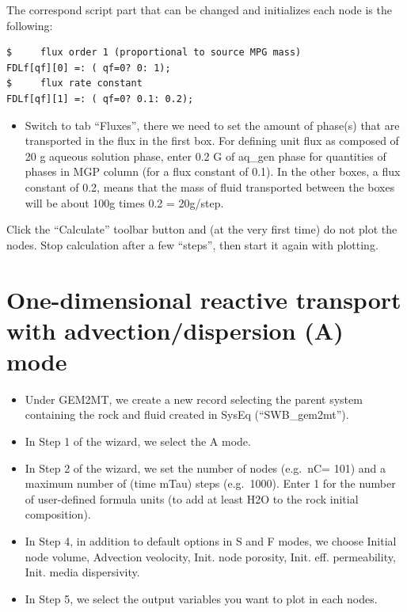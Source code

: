\documentclass[
]{book}
\providecommand{\tightlist}{%
  \setlength{\itemsep}{0pt}\setlength{\parskip}{0pt}}
\begin{document}
The correspond script part that can be changed and initializes each node is the following:

\begin{verbatim}
$     flux order 1 (proportional to source MPG mass)
FDLf[qf][0] =: ( qf=0? 0: 1);
$     flux rate constant
FDLf[qf][1] =: ( qf=0? 0.1: 0.2);
\end{verbatim}

\begin{itemize}
\tightlist
\item
  Switch to tab ``Fluxes'', there we need to set the amount of phase(s) that are transported in the flux in the first box. For defining unit flux as composed of 20 g aqueous solution phase, enter 0.2 G of aq\_gen phase for quantities of phases in MGP column (for a flux constant of 0.1). In the other boxes, a flux constant of 0.2, means that the mass of fluid transported between the boxes will be about 100g times 0.2 = 20g/step.
\end{itemize}

Click the ``Calculate'' toolbar button and (at the very first time) do not plot the nodes. Stop calculation after a few ``steps'', then start it again with plotting.

\hypertarget{one-dimensional-reactive-transport-with-advectiondispersion-a-mode}{%
\section{One-dimensional reactive transport with advection/dispersion (A) mode}\label{one-dimensional-reactive-transport-with-advectiondispersion-a-mode}}

\begin{itemize}
\item
  Under GEM2MT, we create a new record selecting the parent system containing the rock and fluid created in SysEq (``SWB\_gem2mt'').
\item
  In Step 1 of the wizard, we select the A mode.
\item
  In Step 2 of the wizard, we set the number of nodes (e.g.~nC= 101) and a maximum number of (time mTau) steps (e.g.~1000). Enter 1 for the number of user-defined formula units (to add at least H2O to the rock initial composition).
\item
  In Step 4, in addition to default options in S and F modes, we choose Initial node volume, Advection veolocity, Init. node porosity, Init. eff. permeability, Init. media dispersivity.
\item
  In Step 5, we select the output variables you want to plot in each nodes.
\end{itemize}
\end{document}
